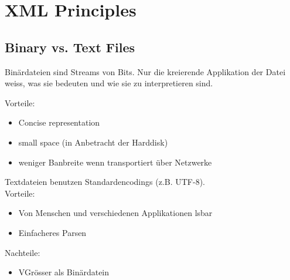 \chapter{XML Principles}
\section{Binary vs. Text Files}
Binärdateien sind Streams von Bits. Nur die kreierende Applikation der Datei weiss, was sie bedeuten und wie sie zu interpretieren sind.

Vorteile:\\
\begin{itemize}
\item Concise representation
\item small space (in Anbetracht der Harddisk)
\item weniger Banbreite wenn transportiert über Netzwerke
\end{itemize}

Textdateien benutzen Standardencodings (z.B. UTF-8).\\

Vorteile:
\begin{itemize}
\item Von Menschen und verschiedenen Applikationen lsbar
\item Einfacheres Parsen
\end{itemize}
Nachteile:
\begin{itemize}
\item VGrösser als Binärdatein
\end{itemize}